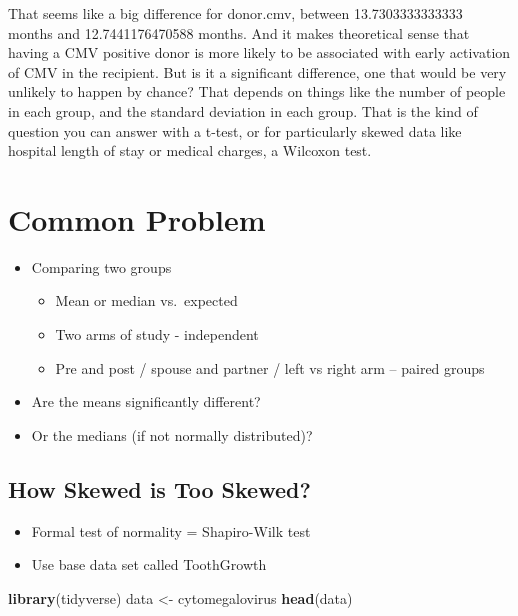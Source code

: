 \documentclass[
]{book}
\newenvironment{Shaded}{\begin{snugshade}}{\end{snugshade}}
\newcommand{\KeywordTok}[1]{\textcolor[rgb]{0.13,0.29,0.53}{\textbf{#1}}}
\newcommand{\NormalTok}[1]{#1}
\newcommand{\StringTok}[1]{\textcolor[rgb]{0.31,0.60,0.02}{#1}}
\providecommand{\tightlist}{%
  \setlength{\itemsep}{0pt}\setlength{\parskip}{0pt}}
\begin{document}
That seems like a big difference for donor.cmv, between 13.7303333333333 months and 12.7441176470588 months. And it makes theoretical sense that having a CMV positive donor is more likely to be associated with early activation of CMV in the recipient. But is it a significant difference, one that would be very unlikely to happen by chance? That depends on things like the number of people in each group, and the standard deviation in each group. That is the kind of question you can answer with a t-test, or for particularly skewed data like hospital length of stay or medical charges, a Wilcoxon test.

\hypertarget{common-problem}{%
\section{Common Problem}\label{common-problem}}

\begin{itemize}
\tightlist
\item
  Comparing two groups

  \begin{itemize}
  \tightlist
  \item
    Mean or median vs.~expected
  \item
    Two arms of study - independent
  \item
    Pre and post / spouse and partner / left vs right arm -- paired groups
  \end{itemize}
\item
  Are the means significantly different?
\item
  Or the medians (if not normally distributed)?
\end{itemize}

\hypertarget{how-skewed-is-too-skewed}{%
\subsection{How Skewed is Too Skewed?}\label{how-skewed-is-too-skewed}}

\begin{itemize}
\tightlist
\item
  Formal test of normality = Shapiro-Wilk test
\item
  Use base data set called ToothGrowth
\end{itemize}

\begin{Shaded}
\begin{Highlighting}[]
\KeywordTok{library}\NormalTok{(tidyverse)}
\NormalTok{data <-}\StringTok{ }\NormalTok{cytomegalovirus}
\KeywordTok{head}\NormalTok{(data)}
\end{Highlighting}
\end{Shaded}
\end{document}
